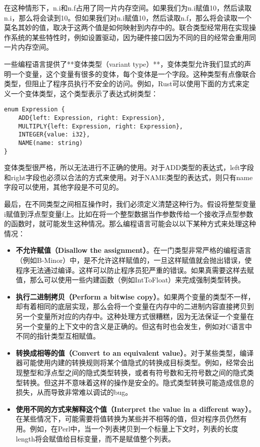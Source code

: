 \documentclass[cn,11pt,chinese]{elegantbook}
\begin{document}
在这种情形下，n.i和n.f占用了同一片内存空间。如果我们为n.i赋值10，然后读取n.i，那么将会读到10。但如果我们对n.i赋值10，然后读取n.f，那么将会读取一个莫名其妙的值，取决于这两个值是如何映射到内存中的。联合类型经常用在实现操作系统的某些特性时，例如设置驱动，因为硬件接口因为不同的目的经常会重用同一片内存空间。

一些编程语言提供了**变体类型（variant type）**，变体类型允许我们显式的声明一个变量，这个变量有很多的变体，每个变体是一个字段。这种类型有点像联合类型，但阻止了程序员执行不安全的访问。例如，Rust可以使用下面的方式来定义一个变体类型，这个类型表示了表达式树类型：

\begin{verbatim}
enum Expression {
    ADD{left: Expression, right: Expression},
    MULTIPLY{left: Expression, right: Expression},
    INTEGER{value: i32},
    NAME(name: string)
}
\end{verbatim}

变体类型很严格，所以无法进行不正确的使用。对于ADD类型的表达式，left字段和right字段也必须以合法的方式来使用。对于NAME类型的表达式，则只有name字段可以使用，其他字段是不可见的。

最后，在不同类型之间相互操作时，我们必须定义清楚这种行为。假设将整型变量i赋值到浮点型变量f上。比如在将一个整型数据当作参数传给一个接收浮点型参数的函数时，就可能发生这种情况。那么编程语言可能会以以下某种方式来处理这种情况：

\begin{itemize}
  \item \textbf{不允许赋值（Disallow the assignment）}。在一门类型非常严格的编程语言（例如B-Minor）中，是不允许这样赋值的，一旦这样赋值就会抛出错误，使程序无法通过编译。这样可以防止程序员犯严重的错误。如果真需要这样去赋值，那么可以使用一些内建函数（例如IntToFloat）来完成强制类型转换。
  \item \textbf{执行二进制拷贝（Perform a bitwise copy）}。如果两个变量的类型不一样，却有着相同的底层实现，那么会将一个变量在内存中的二进制内容直接拷贝到另一个变量所对应的内存中。这种处理方式很糟糕，因为无法保证一个变量在另一个变量的上下文中的含义是正确的。但这有时也会发生，例如对C语言中不同的指针类型互相赋值。
  \item \textbf{转换成相等的值（Convert to an equivalent value）}。对于某些类型，编译器可能使用内建的转换规则将某个值隐式的转换成目标类型。例如，经常会出现整型和浮点型之间的隐式类型转换，或者有符号数和无符号数之间的隐式类型转换。但这并不意味着这样的操作是安全的。隐式类型转换可能造成信息的损失，从而导致非常难以调试的bug。
  \item \textbf{使用不同的方式来解释这个值（Interpret the value in a different way）}。在某些情况下，可能需要将值转换为某些并不相等的值，但对程序员仍然有用。例如，在Perl中，当一个列表拷贝到一个标量上下文时，列表的长度length将会赋值给目标变量，而不是赋值整个列表。
\end{itemize}
\end{document}
